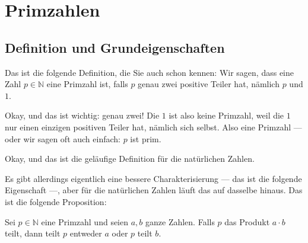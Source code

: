 \section{Primzahlen}
\subsection{Definition und Grundeigenschaften}

\begin{spoken-clean}[00:40:39 - 00:42:16]
Das ist die folgende Definition, die Sie auch schon kennen: Wir sagen, dass eine Zahl $p \in \mathbb{N}$ eine Primzahl ist, falls $p$ genau zwei positive Teiler hat, nämlich $p$ und $1$.

Okay, und das ist wichtig: genau zwei! Die $1$ ist also keine Primzahl, weil die $1$ nur einen einzigen positiven Teiler hat, nämlich sich selbst. Also eine Primzahl --- oder wir sagen oft auch einfach: $p$ ist prim.

Okay, und das ist die geläufige Definition für die natürlichen Zahlen.
\end{spoken-clean}

\begin{math-stroke}

\end{math-stroke}

\begin{spoken-clean}[00:42:16 - 00:43:14]
Es gibt allerdings eigentlich eine bessere Charakterisierung --- das ist die folgende Eigenschaft ---, aber für die natürlichen Zahlen läuft das auf dasselbe hinaus. Das ist die folgende Proposition:

Sei $p \in \mathbb{N}$ eine Primzahl und seien $a, b$ ganze Zahlen. Falls $p$ das Produkt $a \cdot b$ teilt, dann teilt $p$ entweder $a$ oder $p$ teilt $b$.
\end{spoken-clean}

\begin{math-stroke}
\end{math-stroke}

